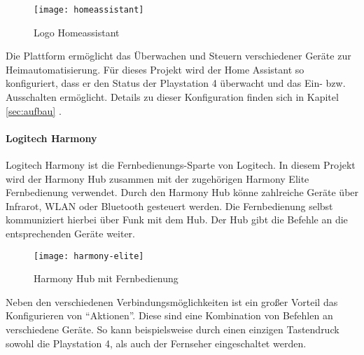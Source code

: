 \begin{figure}[h!]
    \centering
    \texttt{[image: homeassistant]}
    \caption{Logo Homeassistant}\label{fig:homeassistant}
\end{figure}

Die Plattform ermöglicht das Überwachen und Steuern verschiedener Geräte zur Heimautomatisierung.
Für dieses Projekt wird der Home Assistant so konfiguriert,
dass er den Status der Playstation 4 überwacht und das Ein- bzw. Ausschalten ermöglicht.
Details zu dieser Konfiguration finden sich in Kapitel \ref{sec:aufbau} \textit{}.

\paragraph{Logitech Harmony \cite{HarmonyH15:online}}
Logitech Harmony ist die Fernbedienungs-Sparte von Logitech.
In diesem Projekt wird der Harmony Hub zusammen mit der zugehörigen Harmony Elite Fernbedienung verwendet.
Durch den Harmony Hub könne zahlreiche Geräte über Infrarot, WLAN oder Bluetooth gesteuert werden.
Die Fernbedienung selbst kommuniziert hierbei über Funk \cite{HowToPoi90:online} mit dem Hub.
Der Hub gibt die Befehle an die entsprechenden Geräte weiter.

\begin{figure}[h!]
    \centering
    \texttt{[image: harmony-elite]}
    \caption{Harmony Hub mit Fernbedienung}\label{fig:harmony}
\end{figure}

Neben den verschiedenen Verbindungsmöglichkeiten ist ein großer Vorteil das Konfigurieren von \enquote{Aktionen}.
Diese sind eine Kombination von Befehlen an verschiedene Geräte.
So kann beispielsweise durch einen einzigen Tastendruck sowohl die Playstation 4,
als auch der Fernseher eingeschaltet werden.